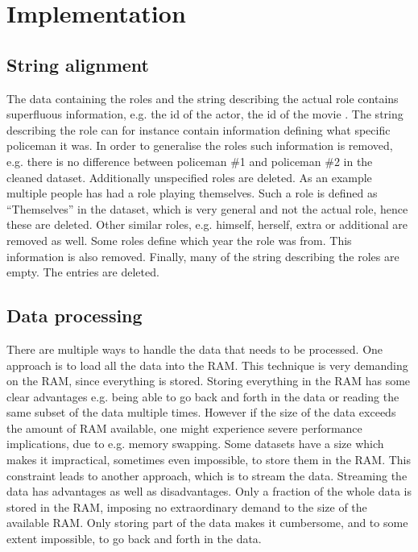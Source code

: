 \section{Implementation}

\subsection{String alignment}
The data containing the roles and the string describing the actual role contains superfluous information, e.g. the id of the actor, the id of the movie . The string describing the role can for instance contain information defining what specific policeman it was. In order to generalise the roles such information is removed, e.g. there is no difference between policeman \#1 and policeman \#2 in the cleaned dataset. Additionally unspecified roles are deleted. As an example multiple people has had a role playing themselves. Such a role is defined as “Themselves” in the dataset, which is very general and not the actual role, hence these are deleted. Other similar roles, e.g. himself, herself, extra or additional are removed as well. Some roles define which year the role was from. This information is also removed. Finally, many of the string describing the roles are empty. The entries are deleted.

\subsection{Data processing}
There are multiple ways to handle the data that needs to be processed.
One approach is to load all the data into the RAM. This technique is very demanding on the RAM, since everything is stored. Storing everything in the RAM has some clear advantages e.g. being able to go back and forth in the data or reading the same subset of the data multiple times. However if the size of the data exceeds the amount of RAM available, one might experience severe performance implications, due to e.g. memory swapping.
Some datasets have a size which makes it impractical, sometimes even impossible, to store them in the RAM. This constraint leads to another approach, which is to stream the data. Streaming the data has advantages as well as disadvantages. Only a fraction of the whole data is stored in the RAM, imposing no extraordinary demand to the size of the available RAM. Only storing part of the data makes it cumbersome, and to some extent impossible, to go back and forth in the data.

